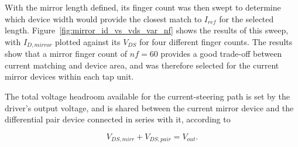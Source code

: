 With the mirror length defined, its finger count was then swept to determine which device width would provide the closest match to $I_{ref}$ for the selected length. Figure~\ref{fig:mirror_id_vs_vds_var_nf} shows the results of this sweep, with $I_{D,mirror}$ plotted against its $V_{DS}$ for four different finger counts. The results show that a mirror finger count of $nf = 60$ provides a good trade-off between current matching and device area, and was therefore selected for the current mirror devices within each tap unit.

The total voltage headroom available for the current-steering path is set by the driver's output voltage, and is shared between the current mirror device and the differential pair device connected in series with it, according to

\begin{equation}
V_{DS,mirr} + V_{DS,pair} = V_{out}.
\label{eq:headroom_split}
\end{equation}

